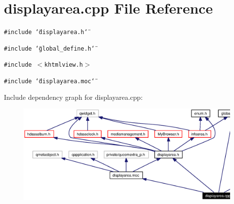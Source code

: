 \section{displayarea.cpp File Reference}
\label{displayarea_8cpp}


{\tt \#include \char`\"{}displayarea.h\char`\"{}}\par
{\tt \#include \char`\"{}global\_\-define.h\char`\"{}}\par
{\tt \#include $<$khtmlview.h$>$}\par
{\tt \#include \char`\"{}displayarea.moc\char`\"{}}\par


Include dependency graph for displayarea.cpp:\begin{figure}[H]
\begin{center}
\leavevmode
\includegraphics[width=352pt]{displayarea_8cpp__incl}
\end{center}
\end{figure}
